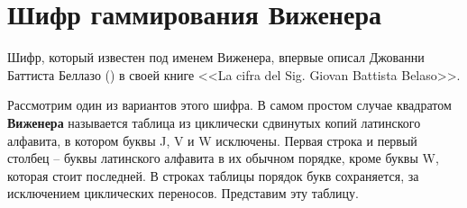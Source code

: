 \section{Шифр гаммирования Виженера}

Шифр, который известен под именем Виженера, впервые описал Джованни Баттиста Беллазо () в своей книге <<La cifra del Sig. Giovan Battista Belaso>>.

Рассмотрим один из вариантов этого шифра. В самом простом случае квадратом \textbf{Виженера} называется таблица из циклически сдвинутых копий латинского алфавита, в котором буквы J, V и W исключены. Первая строка и первый столбец -- буквы латинского алфавита в их обычном порядке, кроме буквы W, которая стоит последней. В строках таблицы порядок букв сохраняется, за исключением циклических переносов. Представим эту таблицу.

